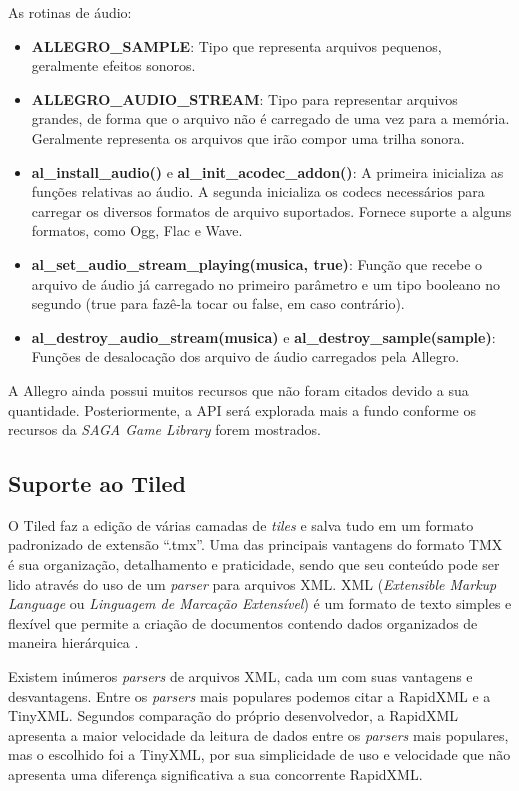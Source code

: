 % 
As rotinas de áudio:
%
\begin{itemize}
 \item \textbf{ALLEGRO\_SAMPLE}: Tipo que representa arquivos pequenos, geralmente efeitos sonoros.
 \item \textbf{ALLEGRO\_AUDIO\_STREAM}: Tipo para representar arquivos grandes, de forma que o arquivo não é carregado de uma vez para a 
 memória. Geralmente representa os arquivos que irão compor uma trilha sonora.
 \item \textbf{al\_install\_audio()} e \textbf{al\_init\_acodec\_addon()}: A primeira inicializa as funções relativas ao áudio. A segunda inicializa os 
 codecs necessários para carregar os diversos formatos de arquivo suportados. Fornece suporte a alguns formatos, como Ogg, Flac e Wave.
 \item \textbf{al\_set\_audio\_stream\_playing(musica, true)}: Função que recebe o arquivo de áudio já carregado no primeiro parâmetro e um tipo 
 booleano no segundo (true para fazê-la tocar ou false, em caso contrário).
 \item \textbf{al\_destroy\_audio\_stream(musica) } e \textbf{al\_destroy\_sample(sample)}: Funções de desalocação dos arquivo de áudio carregados 
 pela Allegro.
\end{itemize}
%
%
A Allegro ainda possui muitos recursos que não foram citados devido a sua quantidade. Posteriormente, a API será explorada mais a fundo conforme os recursos da \textit{SAGA Game Library} forem mostrados.
%
%
\subsection{Suporte ao Tiled}
%
O Tiled faz a edição de várias camadas de \textit{tiles} e salva tudo em um formato padronizado de extensão ``.tmx''. Uma das principais vantagens do formato TMX é sua organização, detalhamento e praticidade, sendo que seu conteúdo pode ser lido através do uso de um \textit{parser} para arquivos XML. XML (\textit{Extensible Markup Language} ou \textit{Linguagem de Marcação Extensível}) é um formato de texto simples e flexível que permite a criação de documentos contendo dados organizados de maneira hierárquica \cite{XMLDOC}.  
\par 
Existem inúmeros \textit{parsers} de arquivos XML, cada um com suas vantagens e desvantagens. Entre os \textit{parsers} mais populares podemos citar a RapidXML e a TinyXML. Segundos comparação do próprio desenvolvedor, a RapidXML apresenta a maior velocidade da leitura de dados entre os \textit{parsers} mais populares, mas o escolhido foi a TinyXML, por sua simplicidade de uso e velocidade que não apresenta uma diferença significativa a sua concorrente RapidXML. 
%
%
